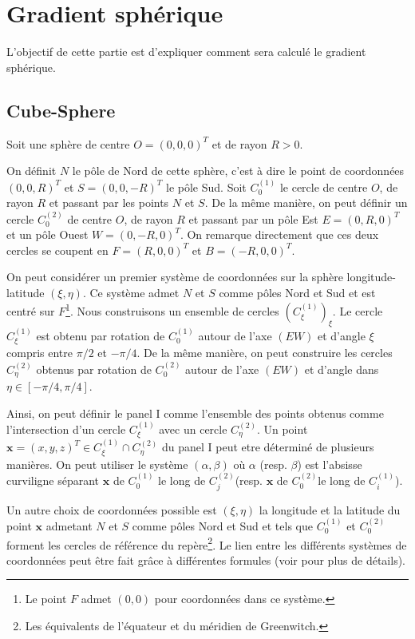 \section{Gradient sphérique}

L'objectif de cette partie est d'expliquer comment sera calculé le gradient sphérique.

\subsection{Cube-Sphere}

Soit une sphère de centre $O = (0,0,0)^T$ et de rayon $R > 0$. 

On définit $N$ le p\^ole de Nord de cette sphère, c'est à dire le point de coordonnées $(0,0,R)^T$ et $S = (0,0,-R)^T$ le p\^ole Sud. Soit $C^{(1)}_0$ le cercle de centre $O$, de rayon $R$ et passant par les points $N$ et $S$. De la m\^eme manière, on peut définir un cercle $C^{(2)}_0$ de centre $O$, de rayon $R$ et passant par un p\^ole Est $E = (0,R,0)^T$ et un p\^ole Ouest $W = (0,-R,0)^T$. On remarque directement que ces deux cercles se coupent en $F = (R,0,0)^T$ et $B=(-R,0,0)^T$.

On peut considérer un premier système de coordonnées sur la sphère longitude-latitude $(\xi, \eta)$. Ce système admet $N$ et $S$ comme p\^oles Nord et Sud et est centré sur $F$\footnote{Le point $F$ admet $(0,0)$ pour coordonnées dans ce système.}.
Nous construisons un ensemble de cercles $\left( C^{(1)}_{\xi} \right)_{\xi}$. Le cercle $C^{(1)}_{\xi}$ est obtenu par rotation de $C^{(1)}_0$ autour de l'axe $(EW)$ et d'angle $\xi$ compris entre $\pi/2$ et $-\pi/4$. De la m\^eme manière, on peut construire les cercles $C^{(2)}_{\eta}$ obtenus par rotation de $C^{(2)}_0$ autour de l'axe $(EW)$ et d'angle dans $ \eta \in \left[ -\pi/4, \pi/4 \right]$.

Ainsi, on peut définir le panel I comme l'ensemble des points obtenus comme l'intersection d'un cercle $C^{(1)}_{\xi}$ avec un cercle $C^{(2)}_{\eta}$. Un point $\mathbf{x}=(x,y,z)^T \in C^{(1)}_{\xi} \cap C^{(2)}_{\eta}$ du panel I peut etre déterminé de plusieurs manières. On peut utiliser le système $(\alpha, \beta)$ où $\alpha$ (resp. $\beta$) est l'absisse curviligne séparant $\mathbf{x}$ de $C^{(1)}_0$ le long de $C^{(2)}_j$(resp. $\mathbf{x}$ de $C^{(2)}_0$le long de $C^{(1)}_i$).

Un autre choix de coordonnées possible est $(\xi, \eta)$ la longitude et la latitude du point $\mathbf{x}$ admetant $N$ et $S$ comme p\^oles Nord et Sud et tels que $C^{(1)}_0$ et $C^{(2)}_0$ forment les cercles de référence du repère\footnote{Les équivalents de l'équateur et du méridien de Greenwitch.}. Le lien entre les différents systèmes de coordonnées peut être fait grâce à différentes formules (voir \cite{Croisille2013} pour plus de détails).

